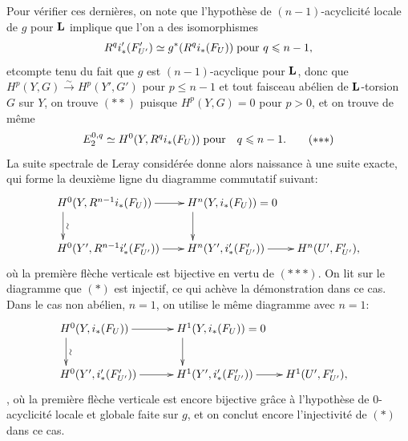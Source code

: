 \documentclass[10pt]{../fichiers-configuration-latex/smfart}
\begin{document}
Pour vérifier ces dernières, on note que l'hypothèse de
$(n-1)$-acyclicité locale de $g$ pour $\mathbf{L}$ implique que l'on a
des isomorphismes
$$
R^{q}i'_{\ast}(F'_{U'})\simeq g^{\ast}(R^{q}i_{\ast}(F_U))\;\mbox{\rm pour } q\leqslant n-1{},
$$
et\pageoriginale compte tenu du fait que $g$ est $(n-1)$-acyclique
pour $\mathbf{L}$, donc que $H^{p}(Y,G)\xrightarrow{\sim}H^{p}(Y',G')$
pour $p\leq n-1$ et tout faisceau abélien de $\mathbf{L}$-torsion $G$
sur $Y$, on trouve $({\ast}{\ast})$ puisque $H^{p}(Y,G)=0$ pour
$p>0$, et on trouve de même
\begin{equation*}
E^{0,q}_2\simeq H^{0}(Y,R{}^qi_{\ast}(F_U))\;\mbox{\rm
pour}\quad q\leq n-1{\quoi}.\tag{${\ast}{\ast}{\ast}$}
\end{equation*}
La suite spectrale de Leray considérée donne alors naissance à une
suite exacte, qui forme la deuxième ligne du diagramme commutatif
suivant:
$$
\xymatrix{
**[r]H^{0}(Y,R^{n-1} i_{\ast}(F_U))  \ar[r] \ar[d]^{\text{\rotatebox{90}{$\sim$}}}&
**[r]H^n(Y,i_{\ast} (F_U)) = 0 \ar[d]\\
**[r]H^{0}(Y', R^{n-1} i'_{\ast}(F'_{U'}))  \ar[r] &
**[r]H^{n}(Y',i'_{\ast}(F'_{U'}))  \ar[r] & **[r]H^{n}(U',F'_{U'}),
}
$$
où la première flèche verticale est bijective en vertu de
$({\ast}{\ast}{\ast})$. On lit sur le diagramme que $(\ast)$ est
injectif, ce qui achève la démonstration dans ce cas. Dans le cas non
abélien, $n=1$, on utilise le même diagramme avec $n=1$:
$$
\xymatrix{
**[r]H^{0}(Y, i_{\ast}(F_U))  \ar[r] \ar[d]^{\text{\rotatebox{90}{$\sim$}}}&
**[r]H^1(Y,i_{\ast} (F_U)) = 0 \ar[d]\\
**[r]H^{0}(Y', i'_{\ast}(F'_{U'}))  \ar[r] &
**[r]H^{1}(Y',i'_{\ast}(F'_{U'}))  \ar[r] & **[r]H^{1}(U',F'_{U'}),&
}
$$
, où la première flèche verticale est encore bijective grâce à
l'hypothèse de $0$-acyclicité locale et globale faite sur $g$, et on
conclut encore l'injectivité de $(\ast)$ dans ce cas.
\end{document}
